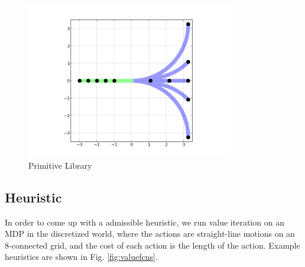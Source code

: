 \documentclass{article}
\begin{document}
\begin{figure}[ht]
\centering
\includegraphics[width=256pt,keepaspectratio]{figures/primitives.png}
\caption{Primitive Library}
\label{fig:prim_lib}
\end{figure}

\subsection{Heuristic}

In order to come up with a admissible heuristic, we run value iteration on an MDP in the discretized world, where the actions are straight-line motions on an 8-connected grid, and the cost of each action is the length of the action. Example heuristics are shown in Fig. \ref{fig:valuefcns}.
 
\end{document}
